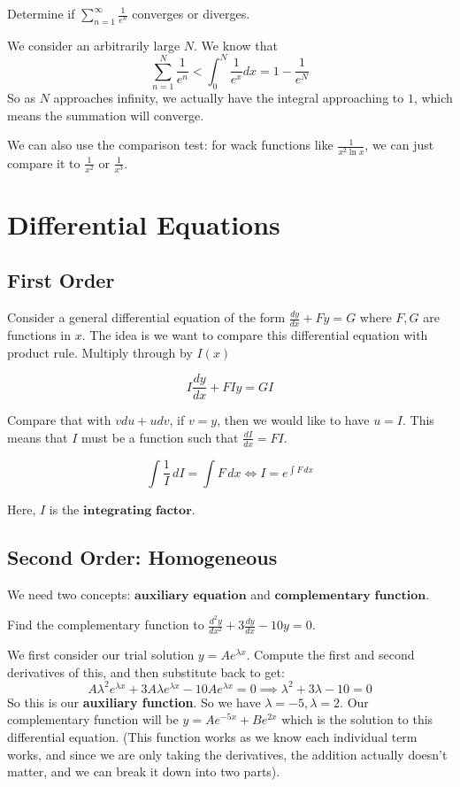 \documentclass{article}
\newcommand{\f}[2]{\frac{#1}{#2}}
\newcommand{\dd}[2]{\frac{d #1}{d #2}}
\newcommand{\intg}[2]{\int #1 \, d#2}
\theoremstyle{mytheoremstyle}
\theoremstyle{mytheoremstyle}
\theoremstyle{myproblemstyle}
\theoremstyle{myproblemstyle}
\begin{document}
    \begin{example}
        Determine if $\displaystyle\sum_{n=1}^{\infty}\f{1}{e^n}$ converges or diverges.
    \end{example}

    We consider an arbitrarily large $N$. We know that \[\displaystyle\sum_{n=1}^{N} \frac{1}{e^n} < \int_0^{N}\f{1}{e^x} dx = 1-\frac{1}{e^N}\]
    So as $N$ approaches infinity, we actually have the integral approaching to $1$, which means the summation will converge. 

    We can also use the comparison test: for wack functions like $\frac{1}{x^2 \ln{x}}$, we can just compare it to $\frac{1}{x^2}$ or $\frac{1}{x^3}$.

    
    
    \section{Differential Equations}
    \subsection{First Order}
    Consider a general differential equation of the form $\dd{y}{x} + Fy = G$ where $F, G$ are functions in $x$. The idea is we want to compare this differential equation with product rule. Multiply through by $I(x)$

    \[I\dd{y}{x} + FIy = GI\]

    Compare that with $vdu + udv$, if $v = y$, then we would like to have $u = I$. This means that $I$ must be a function such that $\dd{I}{x} = FI$. 

    \[\intg{\f{1}{I}}{I} = \intg{F}{x} \iff I = e^{\intg{F}{x}}\]

    Here, $I$ is the $\textbf{integrating factor}$.

    \subsection{Second Order: Homogeneous}
    We need two concepts: $\textbf{auxiliary equation}$ and $\textbf{complementary function}$. 

    \begin{example}
        Find the complementary function to $\frac{d^2y}{dx^2} + 3\frac{dy}{dx} - 10y = 0$.
    \end{example}

    We first consider our trial solution $y = Ae^{\lambda x}$. Compute the first and second derivatives of this, and then substitute back to get: \[A\lambda^2e^{\lambda x} + 3A\lambda e^{\lambda x} - 10Ae^{\lambda x} = 0 \implies \lambda^{2} + 3\lambda - 10 = 0\]
    So this is our \textbf{auxiliary function}. So we have $\lambda = -5, \lambda = 2$. Our complementary function will be $y = Ae^{-5x} + Be^{2x}$ which is the solution to this differential equation. (This function works as we know each individual term works, and since we are only taking the derivatives, the addition actually doesn't matter, and we can break it down into two parts).
\end{document}
